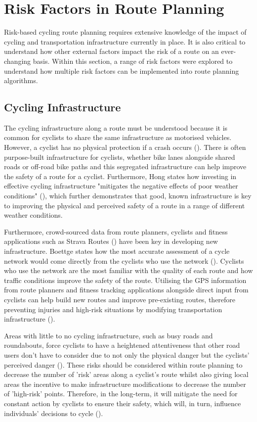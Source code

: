 \section{Risk Factors in Route Planning}
\label{litrev:riskfactors}
Risk-based cycling route planning requires extensive knowledge of the impact of cycling and transportation infrastructure currently in place. It is also critical to understand how other external factors impact the risk of a route on an ever-changing basis. Within this section, a range of risk factors were explored to understand how multiple risk factors can be implemented into route planning algorithms.

\subsection{Cycling Infrastructure}
\label{litrev:cyclinginfrastructure}
The cycling infrastructure along a route must be understood because it is common for cyclists to share the same infrastructure as motorised vehicles. However, a cyclist has no physical protection if a crash occurs (\cite{reynolds_impact_2009}). There is often purpose-built infrastructure for cyclists, whether bike lanes alongside shared roads or off-road bike paths and this segregated infrastructure can help improve the safety of a route for a cyclist. Furthermore, Hong states how investing in effective cycling infrastructure "mitigates the negative effects of poor weather conditions" (\cite{hong_can_2020}), which further demonstrates that good, known infrastructure is key to improving the physical and perceived safety of a route in a range of different weather conditions. 

Furthermore, crowd-sourced data from route planners, cyclists and fitness applications such as Strava Routes (\cite{noauthor_strava_nodate}) have been key in developing new infrastructure. Boettge states how the most accurate assessment of a cycle network would come directly from the cyclists who use the network (\cite{boettge_assessing_2017}). Cyclists who use the network are the most familiar with the quality of each route and how traffic conditions improve the safety of the route. Utilising the GPS information from route planners and fitness tracking applications alongside direct input from cyclists can help build new routes and improve pre-existing routes, therefore preventing injuries and high-risk situations by modifying transportation infrastructure (\cite{reynolds_impact_2009}).

Areas with little to no cycling infrastructure, such as busy roads and roundabouts, force cyclists to have a heightened attentiveness that other road users don't have to consider due to not only the physical danger but the cyclists' perceived danger (\cite{doorley_analysis_2015}). These risks should be considered within route planning to decrease the number of 'risk' areas along a cyclist's route whilst also giving local areas the incentive to make infrastructure modifications to decrease the number of 'high-risk' points. Therefore, in the long-term, it will mitigate the need for constant action by cyclists to ensure their safety, which will, in turn, influence individuals' decisions to cycle (\cite{reynolds_impact_2009}).

